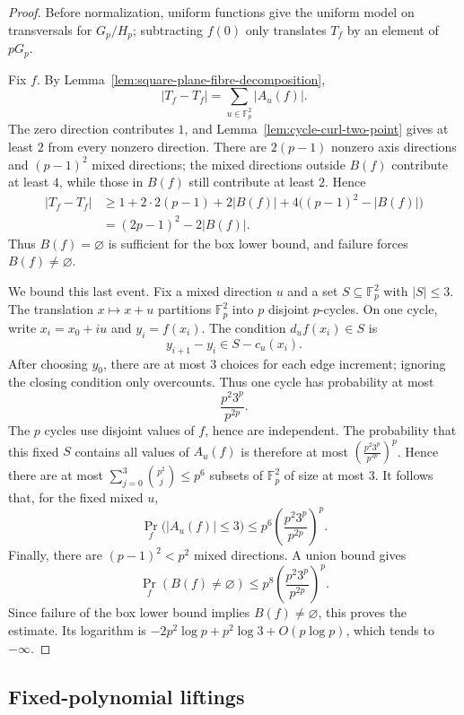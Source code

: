 \documentclass[reqno]{amsart}
\numberwithin{equation}{section}
\theoremstyle{definition}
\begin{document}
\begin{proof}
Before normalization, uniform functions give the uniform model on transversals
for $G_p/H_p$; subtracting $f(0)$ only translates $T_f$ by an element of \(pG_p\).

Fix $f$.  By Lemma~\ref{lem:square-plane-fibre-decomposition},
\[
  |T_f-T_f|=\sum_{u\in\mathbb F_p^2}|A_u(f)|.
\]
The zero direction contributes $1$, and
Lemma~\ref{lem:cycle-curl-two-point} gives at least $2$ from every nonzero
direction.  There are $2(p-1)$ nonzero axis directions and $(p-1)^2$ mixed
directions; the mixed directions outside $B(f)$ contribute at least $4$, while
those in $B(f)$ still contribute at least $2$.  Hence
\[
\begin{aligned}
  |T_f-T_f|
  &\geq 1+2\cdot 2(p-1)+2|B(f)|+4\bigl((p-1)^2-|B(f)|\bigr) \\
  &= (2p-1)^2-2|B(f)|.
\end{aligned}
\]
Thus \(B(f)=\varnothing\) is sufficient for the box lower bound, and failure
forces \(B(f)\neq\varnothing\).

We bound this last event.  Fix a mixed direction $u$ and a set
$S\subseteq\mathbb F_p^2$ with $|S|\leq 3$.  The translation \(x\mapsto x+u\)
partitions \(\mathbb F_p^2\) into \(p\) disjoint \(p\)-cycles.  On one cycle,
write \(x_i=x_0+iu\) and \(y_i=f(x_i)\).  The condition \(d_u f(x_i)\in S\) is
\[
  y_{i+1}-y_i\in S-c_u(x_i).
\]
After choosing \(y_0\), there are at most \(3\) choices for each edge increment;
ignoring the closing condition only overcounts.  Thus one cycle has probability
at most
\[
  \frac{p^2 3^p}{p^{2p}}.
\]
The $p$ cycles use disjoint values of $f$, hence are independent.  The
probability that this fixed $S$ contains all values of $A_u(f)$ is therefore at
most
$
  \left(\frac{p^2 3^p}{p^{2p}}\right)^p$.
Hence there are at most
$
  \sum_{j=0}^3 \binom{p^2}{j}\leq p^6
$
subsets of $\mathbb F_p^2$ of size at most $3$. It follows that, for the fixed mixed
$u$,
\[
  \Pr_f\bigl(|A_u(f)|\leq 3\bigr)
  \leq
  p^6\left(\frac{p^2 3^p}{p^{2p}}\right)^p.
\]
Finally, there are $(p-1)^2<p^2$ mixed directions.  A union bound gives
\[
  \Pr_f(B(f)\neq\varnothing)
  \leq
  p^8\left(\frac{p^2 3^p}{p^{2p}}\right)^p.
\]
Since failure of the box lower bound implies $B(f)\neq\varnothing$, this proves
the estimate.  Its logarithm is
\(-2p^2\log p+p^2\log 3+O(p\log p)\), which tends to \(-\infty\).
\end{proof}

\subsection{Fixed-polynomial liftings}
\label{subsec:fixed-polynomial-liftings}
\end{document}
